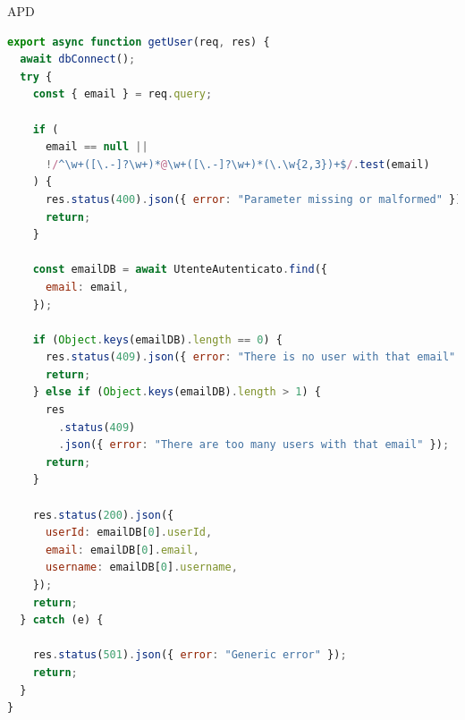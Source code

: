 \begin{listaPersonale} {APD}
\begin{listaPersonale2}[APD]{}

                \begin{lstlisting}[language=JavaScript]
export async function getUser(req, res) {
  await dbConnect();
  try {
    const { email } = req.query;

    if (
      email == null ||
      !/^\w+([\.-]?\w+)*@\w+([\.-]?\w+)*(\.\w{2,3})+$/.test(email)
    ) {
      res.status(400).json({ error: "Parameter missing or malformed" });
      return;
    }

    const emailDB = await UtenteAutenticato.find({
      email: email,
    });

    if (Object.keys(emailDB).length == 0) {
      res.status(409).json({ error: "There is no user with that email" });
      return;
    } else if (Object.keys(emailDB).length > 1) {
      res
        .status(409)
        .json({ error: "There are too many users with that email" });
      return;
    }

    res.status(200).json({
      userId: emailDB[0].userId,
      email: emailDB[0].email,
      username: emailDB[0].username,
    });
    return;
  } catch (e) {
    
    res.status(501).json({ error: "Generic error" });
    return;
  }
}
                \end{lstlisting}
                \newpage
    \end{listaPersonale2}
\end{listaPersonale}